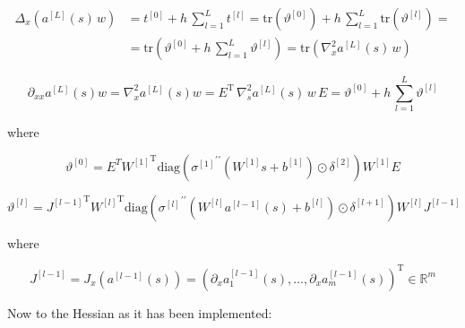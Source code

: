 \begin{align*}
    \Delta_x (a^{[L]}(s) \, w) & = t^{[0]} + h \, \sum^{L}_{l=1} t^{[l]} = \mathrm{tr}(\vartheta^{[0]}) + h \, \sum^{L}_{l=1} \mathrm{tr}(\vartheta^{[l]}) = \\
    & = \mathrm{tr} \left( \vartheta^{[0]} + h \, \sum^{L}_{l=1} \vartheta^{[l]} \right) = \mathrm{tr} \left( \nabla^{2}_x a^{[L]}(s) \, w \right)
\end{align*}

\begin{equation*}
    \partial_{xx} a^{[L]}(s) w = \nabla^{2}_x a^{[L]}(s) w = E^{\mathrm{T}} \, \nabla^{2}_s a^{[L]}(s) \, w \, E = \vartheta^{[0]} + h \, \sum^{L}_{l=1} \vartheta^{[l]}
\end{equation*}

where 

\begin{equation*}
    \vartheta^{[0]} = E^T {W^{[1]}}^{\mathrm{T}} \mathrm{diag}({\sigma^{[1]}}^{\prime \prime}(W^{[1]} s + b^{[1]}) \odot \delta^{[2]}) W^{[1]} E
\end{equation*}

\begin{equation*}
    \vartheta^{[l]} = {J^{[l-1]}}^{\mathrm{T}} {W^{[l]}}^{\mathrm{T}} \mathrm{diag}({\sigma^{[l]}}^{\prime \prime}(W^{[l]} a^{[l-1]}(s) + b^{[l]}) \odot \delta^{[l+1]}) W^{[l]} J^{[l-1]}
\end{equation*}

where 

\begin{equation*}
    J^{[l-1]} = J_x(a^{[l-1]}(s)) = \left( \partial_x a^{[l-1]}_1(s), \ldots, \partial_x a^{[l-1]}_m(s) \right)^{\mathrm{T}} \in \mathbb{R}^{m}
\end{equation*}


Now to the Hessian as it has been implemented: 

